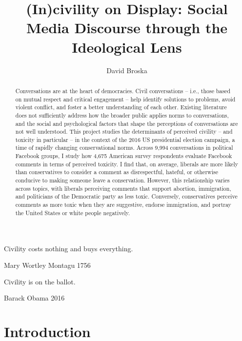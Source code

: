 \documentclass{article}
\title{(In)civility on Display: Social Media Discourse through the Ideological Lens}
\author[1]{David Broska}
\begin{document}
\maketitle

\begin{abstract}
Conversations are at the heart of democracies. Civil conversations – i.e., those based on mutual respect and critical engagement – help identify solutions to problems, avoid violent conflict, and foster a better understanding of each other. Existing literature does not sufficiently address how the broader public applies norms to conversations, and the social and psychological factors that shape the perceptions of conversations are not well understood. This project studies the determinants of perceived civility – and toxicity in particular – in the context of the 2016 US presidential election campaign, a time of rapidly changing conservational norms. Across 9,994 conversations in political Facebook groups, I study how 4,675 American survey respondents evaluate Facebook comments in terms of perceived toxicity. I find that, on average, liberals are more likely than conservatives to consider a comment as disrespectful, hateful, or otherwise conducive to making someone leave a conservation. However, this relationship varies across topics, with liberals perceiving comments that support abortion, immigration, and politicians of the Democratic party as less toxic. Conversely, conservatives perceive comments as more toxic when they are suggestive, endorse immigration, and portray the United States or white people negatively.
\end{abstract}
\clearpage

\epigraph{Civility costs nothing and buys everything.}{Mary Wortley Montagu 1756}
\epigraph{Civility is on the ballot.}{Barack Obama 2016}

\section{Introduction}
\end{document}
